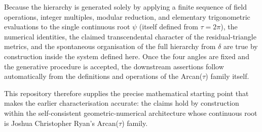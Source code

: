 Because the hierarchy is generated solely by applying a finite sequence of field operations, integer multiples, modular reduction, and elementary trigonometric evaluations to the single continuous root \(\psi\) (itself defined from \(\tau = 2\pi\)), the numerical identities, the claimed transcendental character of the residual-triangle metrics, and the spontaneous organisation of the full hierarchy from \(\delta\) are true by construction inside the system defined here. Once the four angles are fixed and the generative procedure is accepted, the downstream assertions follow automatically from the definitions and operations of the Arcan(\(\tau\)) family itself.

This repository therefore supplies the precise mathematical starting point that makes the earlier characterisation accurate: the claims hold by construction within the self-consistent geometric-numerical architecture whose continuous root is Joshua Christopher Ryan’s Arcan(\(\tau\)) family.

